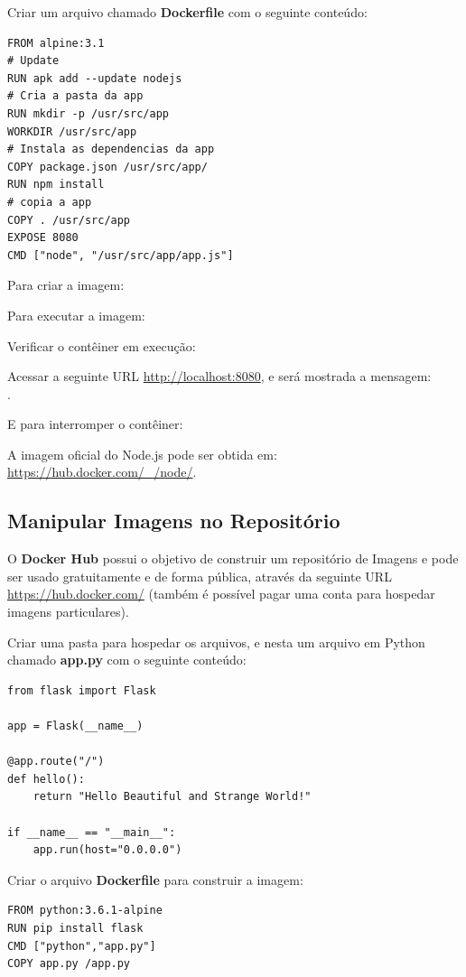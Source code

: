 \documentclass[a4paper,11pt]{article}
\begin{document}
Criar um arquivo chamado \textbf{Dockerfile} com o seguinte conteúdo:
\begin{lstlisting}[]
FROM alpine:3.1
# Update
RUN apk add --update nodejs
# Cria a pasta da app
RUN mkdir -p /usr/src/app
WORKDIR /usr/src/app
# Instala as dependencias da app
COPY package.json /usr/src/app/
RUN npm install
# copia a app
COPY . /usr/src/app
EXPOSE 8080
CMD ["node", "/usr/src/app/app.js"]
\end{lstlisting}

Para criar a imagem: \\

Para executar a imagem: \\

Verificar o contêiner em execução: \\

Acessar a seguinte URL \url{http://localhost:8080}, e será mostrada a mensagem: \\ .

E para interromper o contêiner: \\

A imagem oficial do Node.js pode ser obtida em: 
\url{https://hub.docker.com/_/node/}.

\subsection{Manipular Imagens no Repositório}
O \textbf{Docker Hub} possui o objetivo de construir um repositório de Imagens e pode ser usado gratuitamente e de forma pública, através da seguinte URL \url{https://hub.docker.com/} (também é possível pagar uma conta para hospedar imagens particulares).

Criar uma pasta para hospedar os arquivos, e nesta um arquivo em Python chamado \textbf{app.py} com o seguinte conteúdo:
\begin{lstlisting}[]
from flask import Flask

app = Flask(__name__)

@app.route("/")
def hello():
	return "Hello Beautiful and Strange World!"

if __name__ == "__main__":
	app.run(host="0.0.0.0")
\end{lstlisting}

Criar o arquivo \textbf{Dockerfile} para construir a imagem:
\begin{lstlisting}[]
FROM python:3.6.1-alpine
RUN pip install flask
CMD ["python","app.py"]
COPY app.py /app.py
\end{lstlisting}
\end{document}
